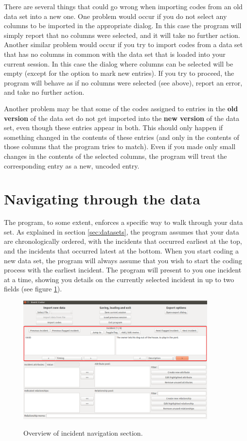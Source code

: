 \documentclass{memoir}
\begin{document}
There are several things that could go wrong when importing codes from an old data set into a new one. One problem would occur if you do not select any columns to be imported in the appropriate dialog. In this case the program will simply report that no columns were selected, and it will take no further action. Another similar problem would occur if you try to import codes from a data set that has no columns in common with the data set that is loaded into your current session. In this case the dialog where columns can be selected will be empty (except for the option to mark new entries). If you try to proceed, the program will behave as if no columns were selected (see above), report an error, and take no further action.

Another problem may be that some of the codes assigned to entries in the \textbf{old version} of the data set do not get imported into the \textbf{new version} of the data set, even though these entries appear in both. This should only happen if something changed in the contents of these entries (and only in the contents of those columns that the program tries to match). Even if you made only small changes in the contents of the selected columns, the program will treat the corresponding entry as a new, uncoded entry. 

\section{Navigating through the data}
\label{sec:navigatingdata}

The program, to some extent, enforces a specific way to walk through your data set. As explained in section \ref{sec:datasets}, the program assumes that your data are chronologically ordered, with the incidents that occurred earliest at the top, and the incidents that occurred latest at the bottom. When you start coding a new data set, the program will always assume that you wish to start the coding process with the earliest incident. The program will present to you one incident at a time, showing you details on the currently selected incident in up to two fields (see figure \ref{fig:incidentsoverview}). 

\begin{figure}[h!]
  \centering
  \caption{Overview of incident navigation section.}
  \includegraphics[width=100mm]{Screenshot_4.pdf}
  \label{fig:incidentsoverview}
\end{figure}
\end{document}
